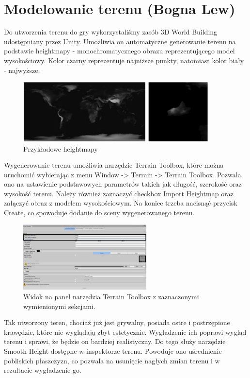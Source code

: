\section{Modelowanie terenu (Bogna Lew)}
Do utworzenia terenu do gry wykorzystaliśmy zasób 3D World Building udostępniany przez Unity. Umożliwia on automatyczne
generowanie terenu na podstawie heightmapy - monochromatycznego obrazu reprezentującego model wysokościowy. Kolor czarny
reprezentuje najniższe punkty, natomiast kolor biały -  najwyższe.

\begin{figure}[h!]
    \centering
    \includegraphics[width=0.9\textwidth]{images/modelowanie_terenu/przykladowe_heightmapy.jpg}
    \caption{Przykładowe heightmapy}\label{fig:przykladowe_heightmapy}
\end{figure}

Wygenerowanie terenu umożliwia narzędzie Terrain Toolbox, które można uruchomić wybierając z menu Window -> Terrain ->
Terrain Toolbox. Pozwala ono na ustawienie podstawowych parametrów takich jak długość, szerokość oraz wysokość terenu.
Należy również zaznaczyć checkbox Import Heightmap oraz załączyć obraz z modelem wysokościowym. Na koniec trzeba nacisnąć
przycisk Create, co spowoduje dodanie do sceny wygenerowanego terenu.

\begin{figure}[h!]
    \centering
    \includegraphics[width=0.6\textwidth]{images/modelowanie_terenu/generowanie.jpg}
    \caption{Widok na panel narzędzia Terrain Toolbox z zaznaczonymi wymienionymi sekcjami.}\label{fig:generowanie_terenu}
\end{figure}

Tak utworzony teren, chociaż już jest grywalny, posiada ostre i postrzępione krawędzie, które nie wyglądają zbyt
estetycznie. Wygładzenie ich poprawi wygląd terenu i sprawi, że będzie on bardziej realistyczny. Do tego służy narzędzie
Smooth Height dostępne w inspektorze terenu. Powoduje ono uśrednienie pobliskich płaszczyzn, co pozwala na usunięcie
nagłych zmian terenu i w rezultacie wygładzenie go.

